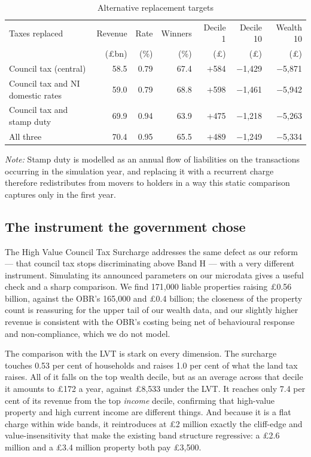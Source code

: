 \begin{table}[htbp]
\centering
\footnotesize
\caption{Alternative replacement targets}
\label{tab:targets}
\begin{tabular}{lrrrrrr}
\toprule
Taxes replaced & Revenue & Rate & Winners & Decile 1 & Decile 10 & Wealth 10 \\
 & (\pounds bn) & (\%) & (\%) & (\pounds) & (\pounds) & (\pounds) \\
\midrule
Council tax (central)              & 58.5 & 0.79 & 67.4 & $+$584 & $-$1{,}429 & $-$5{,}871 \\
Council tax and NI domestic rates  & 59.0 & 0.79 & 68.8 & $+$598 & $-$1{,}461 & $-$5{,}942 \\
Council tax and stamp duty         & 69.9 & 0.94 & 63.9 & $+$475 & $-$1{,}218 & $-$5{,}263 \\
All three                          & 70.4 & 0.95 & 65.5 & $+$489 & $-$1{,}249 & $-$5{,}334 \\
\bottomrule
\end{tabular}

\medskip
{\footnotesize\emph{Note:} Stamp duty is modelled as an annual flow of liabilities on the transactions occurring in the simulation year, and replacing it with a recurrent charge therefore redistributes from movers to holders in a way this static comparison captures only in the first year.}
\end{table}

\subsection{The instrument the government chose}
\label{sec:hvcts}

The High Value Council Tax Surcharge \citep{hmt2025} addresses the same defect as our reform --- that council tax stops discriminating above Band H --- with a very different instrument. Simulating its announced parameters on our microdata gives a useful check and a sharp comparison. We find 171{,}000 liable properties raising \pounds 0.56 billion, against the OBR's 165{,}000 and \pounds 0.4 billion; the closeness of the property count is reassuring for the upper tail of our wealth data, and our slightly higher revenue is consistent with the OBR's costing being net of behavioural response and non-compliance, which we do not model.

The comparison with the LVT is stark on every dimension. The surcharge touches 0.53 per cent of households and raises 1.0 per cent of what the land tax raises. All of it falls on the top wealth decile, but as an average across that decile it amounts to \pounds 172 a year, against \pounds 8{,}533 under the LVT. It reaches only 7.4 per cent of its revenue from the top \emph{income} decile, confirming that high-value property and high current income are different things. And because it is a flat charge within wide bands, it reintroduces at \pounds 2 million exactly the cliff-edge and value-insensitivity that make the existing band structure regressive: a \pounds 2.6 million and a \pounds 3.4 million property both pay \pounds 3{,}500.


